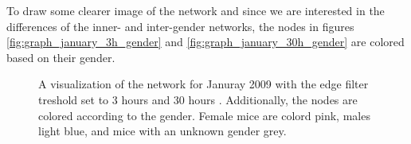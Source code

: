 To draw some clearer image of the network and since we are interested in the differences of the inner- and inter-gender networks, the nodes in figures \ref{fig:graph_january_3h_gender} and \ref{fig:graph_january_30h_gender} are colored based on their gender.

\begin{figure}[htpb]%
	\centering 
	\qquad 
			
	\caption[Network visualizations with different edge filter values]{A visualization of the network for Januray 2009 with the edge filter treshold set to 3 hours  and 30 hours . Additionally, the nodes are colored according to the gender. Female mice are colord pink, males light blue, and mice with an unknown gender grey.} 
	 
\end{figure}

